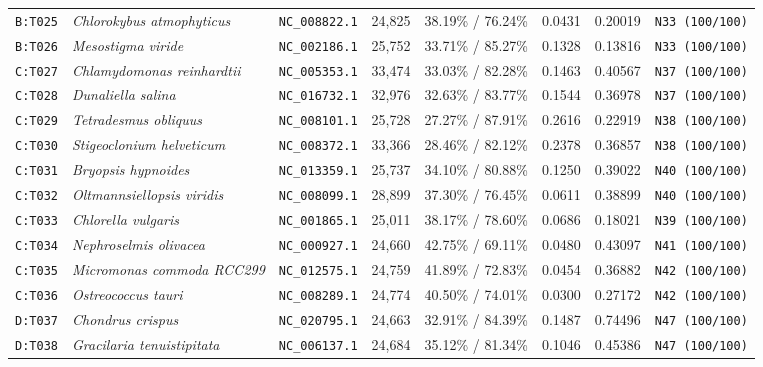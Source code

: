 \documentclass[10pt,letterpaper]{article}
\begin{document}
\begin{longtable}{llllllll}
\texttt{B:T025} & \textit{Chlorokybus atmophyticus} & \texttt{NC\_008822.1} & 24,825 & 38.19\% / 76.24\% & 0.0431 & 0.20019 & \texttt{N33 (100/100)} \\
\texttt{B:T026} & \textit{Mesostigma viride} & \texttt{NC\_002186.1} & 25,752 & 33.71\% / 85.27\% & 0.1328 & 0.13816 & \texttt{N33 (100/100)} \\
\texttt{C:T027} & \textit{Chlamydomonas reinhardtii} & \texttt{NC\_005353.1} & 33,474 & 33.03\% / 82.28\% & 0.1463 & 0.40567 & \texttt{N37 (100/100)} \\
\texttt{C:T028} & \textit{Dunaliella salina} & \texttt{NC\_016732.1} & 32,976 & 32.63\% / 83.77\% & 0.1544 & 0.36978 & \texttt{N37 (100/100)} \\
\texttt{C:T029} & \textit{Tetradesmus obliquus} & \texttt{NC\_008101.1} & 25,728 & 27.27\% / 87.91\% & 0.2616 & 0.22919 & \texttt{N38 (100/100)} \\
\texttt{C:T030} & \textit{Stigeoclonium helveticum} & \texttt{NC\_008372.1} & 33,366 & 28.46\% / 82.12\% & 0.2378 & 0.36857 & \texttt{N38 (100/100)} \\
\texttt{C:T031} & \textit{Bryopsis hypnoides} & \texttt{NC\_013359.1} & 25,737 & 34.10\% / 80.88\% & 0.1250 & 0.39022 & \texttt{N40 (100/100)} \\
\texttt{C:T032} & \textit{Oltmannsiellopsis viridis} & \texttt{NC\_008099.1} & 28,899 & 37.30\% / 76.45\% & 0.0611 & 0.38899 & \texttt{N40 (100/100)} \\
\texttt{C:T033} & \textit{Chlorella vulgaris} & \texttt{NC\_001865.1} & 25,011 & 38.17\% / 78.60\% & 0.0686 & 0.18021 & \texttt{N39 (100/100)} \\
\texttt{C:T034} & \textit{Nephroselmis olivacea} & \texttt{NC\_000927.1} & 24,660 & 42.75\% / 69.11\% & 0.0480 & 0.43097 & \texttt{N41 (100/100)} \\
\texttt{C:T035} & \textit{Micromonas commoda RCC299} & \texttt{NC\_012575.1} & 24,759 & 41.89\% / 72.83\% & 0.0454 & 0.36882 & \texttt{N42 (100/100)} \\
\texttt{C:T036} & \textit{Ostreococcus tauri} & \texttt{NC\_008289.1} & 24,774 & 40.50\% / 74.01\% & 0.0300 & 0.27172 & \texttt{N42 (100/100)} \\
\texttt{D:T037} & \textit{Chondrus crispus} & \texttt{NC\_020795.1} & 24,663 & 32.91\% / 84.39\% & 0.1487 & 0.74496 & \texttt{N47 (100/100)} \\
\texttt{D:T038} & \textit{Gracilaria tenuistipitata} & \texttt{NC\_006137.1} & 24,684 & 35.12\% / 81.34\% & 0.1046 & 0.45386 & \texttt{N47 (100/100)} \\

\end{longtable}
\end{document}
